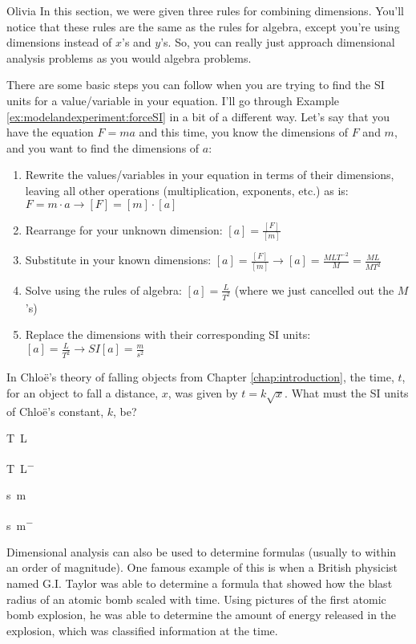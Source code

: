 \begin{studentOpinion}{Olivia}
In this section, we were given three rules for combining dimensions. You'll notice that these rules are the same as the rules for algebra, except you're using dimensions instead of $x$'s and $y$'s. So, you can really just approach dimensional analysis problems as you would algebra problems.

There are some basic steps you can follow when you are trying to find the SI units for a value/variable in your equation. I'll go through Example \ref{ex:modelandexperiment:forceSI} in a bit of a different way. Let's say that you have the equation $F=ma$ and this time, you know the dimensions of $F$ and $m$, and you want to find the dimensions of $a$:
\begin{enumerate}[itemsep=1ex]
\item Rewrite the values/variables in your equation in terms of their dimensions, leaving all other operations (multiplication, exponents, etc.) as is: $F=m\cdot a\rightarrow [F]=[m]\cdot[a]$
\item Rearrange for your unknown dimension: $[a]=\frac{[F]}{[m]}$
\item Substitute in your known dimensions: $[a]=\frac{[F]}{[m]} \rightarrow [a]=\frac{MLT^{-2}}{M}=\frac{ML}{MT^2}$
\item Solve using the rules of algebra: $[a]=\frac{L}{T^2}$ (where we just cancelled out the $M$'s)
\item Replace the dimensions with their corresponding SI units: $[a]=\frac{L}{T^2}\rightarrow SI[a]=\frac{m}{s^2}$
\end{enumerate}
\end{studentOpinion}

\begin{checkpoint}
\begin{MCquestion}{In Chlo\"e's theory of falling objects from Chapter \ref{chap:introduction}, the time, $t$, for an object to fall a distance, $x$, was given by $t=k\sqrt{x}$. What must the SI units of Chlo\"e's constant, $k$, be?}
\item \si{T.L^{}}
\item \si{T.L^{-}}
\item \si{s.m^{}}
\item \si{s.m^{-}} \correct
\end{MCquestion}
\end{checkpoint}

Dimensional analysis can also be used to determine formulas (usually to within an order of magnitude). One famous example of this is when a British physicist named G.I. Taylor was able to determine a formula that showed how the blast radius of an atomic bomb scaled with time. Using pictures of the first atomic bomb explosion, he was able to determine the amount of energy released in the explosion, which was classified information at the time. 

